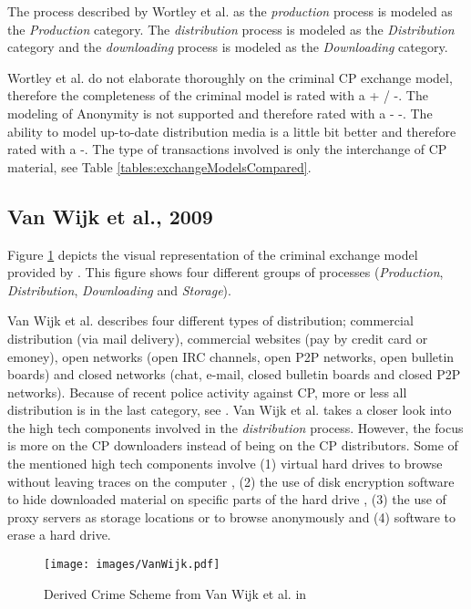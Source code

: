 \documentclass{sig-alternate-br}
\begin{document}
The process described by Wortley et al. as the \textit{production} process is modeled as the \textit{Production} category. The \textit{distribution} process is modeled as the \textit{Distribution} category and the \textit{downloading} process is modeled as the \textit{Downloading} category.

Wortley et al. do not elaborate thoroughly on the criminal CP exchange model, therefore the completeness of the criminal model is rated with a + / -. The modeling of Anonymity is not supported and therefore rated with a - -. The ability to model up-to-date distribution media is a little bit better and therefore rated with a -.  The type of transactions involved is only the interchange of CP material, see Table \ref{tables:exchangeModelsCompared}.

\subsection{Van Wijk et al., 2009 \cite{wijk2009achter}}
Figure \ref{fig:wijk_01} depicts the visual representation of the criminal exchange model provided by \cite{wijk2009achter}. This figure shows four different groups of processes (\textit{Production}, \textit{Distribution}, \textit{Downloading} and \textit{Storage}).

Van Wijk et al. \cite{wijk2009achter} describes four different types of distribution; commercial distribution (via mail delivery), commercial websites (pay by credit card or emoney), open networks (open IRC channels, open P2P networks, open bulletin boards) and closed networks (chat, e-mail, closed bulletin boards and closed P2P networks). Because of recent police activity against CP, more or less all distribution is in the last category, see \cite{wortley2006child, callanan2009internet}. Van Wijk et al. takes a closer look into the high tech components involved in the \textit{distribution} process. However, the focus is more on the CP downloaders instead of being on the CP distributors. Some of the mentioned high tech components involve (1) virtual hard drives to browse without leaving traces on the computer \cite{site:VHD}, (2) the use of disk encryption software to hide downloaded material on specific parts of the hard drive \cite{site:diskenc}, (3) the use of proxy servers as storage locations or to browse anonymously \cite{site:proxy} and (4) software to erase a hard drive.

\begin{figure}[ht]
\centering
\texttt{[image: images/VanWijk.pdf]}
\caption{Derived Crime Scheme from Van Wijk et al. in \cite{wijk2009achter}}
\label{fig:wijk_01}
\end{figure}
\end{document}
